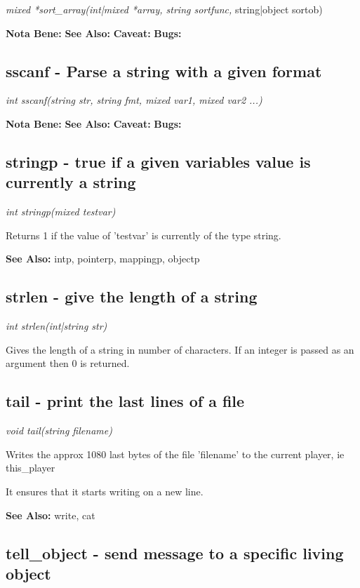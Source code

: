     {\em mixed *sort\_array(int|mixed *array, string sortfunc,}
              string|object sortob)

    {\bf Nota Bene: }
    {\bf See Also: }
    {\bf Caveat: }
    {\bf Bugs: }

\subsection{sscanf - Parse a string with a given format}

    {\em int sscanf(string str, string fmt, mixed var1, mixed var2 ...)}


    {\bf Nota Bene: }
    {\bf See Also: }
    {\bf Caveat: }
    {\bf Bugs: }

\subsection{stringp - true if a given variables value is currently a string}

    {\em int stringp(mixed testvar)}

    Returns 1 if the value of 'testvar' is currently of the type string.

    {\bf See Also: }    intp, pointerp, mappingp, objectp



\subsection{strlen - give the length of a string}

    {\em int strlen(int|string str)}

    Gives the length of a string in number of characters. If an integer
    is passed as an argument then 0 is returned.


\subsection{tail - print the last lines of a file}

    {\em void tail(string filename)}

    Writes the approx 1080 last bytes of the file 'filename' to the
    current player, ie this\_player 

    It ensures that it starts writing on a new line.

    {\bf See Also: }    write, cat



\subsection{tell\_object - send message to a specific living object}

